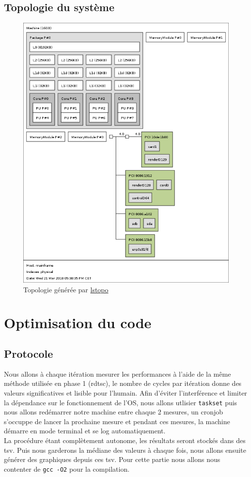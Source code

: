 \documentclass{report}
\begin{document}
  \subsection{Topologie du système}
    \begin{figure}[ht!]
      \centering
      \includegraphics[scale=0.35]{resources/lstopo.png}
      \caption{Topologie générée par \href{https://manpages.debian.org/jessie/hwloc/lstopo.1.en.html}{lstopo}}
    \end{figure}
  \newpage
\section{Optimisation du code}
  \subsection{Protocole }
    Nous allons à chaque itération mesurer les performances à l'aide de la même méthode utilisée en phase 1
    (rdtsc), le nombre de cycles par itération donne des valeurs significatives et lisible pour l'humain.
    Afin d'éviter l'interférence et limiter la dépendance sur le fonctionnement de l'OS, nous allons
    utlisier \texttt{taskset} puis nous allons redémarrer notre machine entre chaque 2 mesures, un
    cronjob s'occuppe de lancer la prochaine mesure et pendant ces mesures, la machine démarre
    en mode terminal et se log automatiquement.
    \\La procédure étant complètement autonome, les résultats seront stockés dans des tsv.
    Puis nous garderons la médiane des valeurs à chaque fois, nous allons ensuite générer des
    graphiques depuis ces tsv.
    Pour cette partie nous allons nous contenter de \texttt{gcc -O2} pour la compilation.
\end{document}
